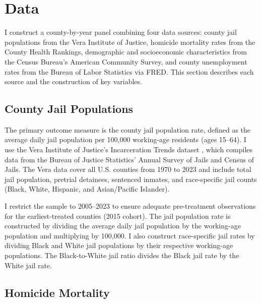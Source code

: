 \documentclass[12pt]{article}
\begin{document}
\section{Data}

I construct a county-by-year panel combining four data sources: county jail populations from the Vera Institute of Justice, homicide mortality rates from the County Health Rankings, demographic and socioeconomic characteristics from the Census Bureau's American Community Survey, and county unemployment rates from the Bureau of Labor Statistics via FRED. This section describes each source and the construction of key variables.

\subsection{County Jail Populations}

The primary outcome measure is the county jail population rate, defined as the average daily jail population per 100,000 working-age residents (ages 15--64). I use the Vera Institute of Justice's Incarceration Trends dataset \citep{vera2024incarceration}, which compiles data from the Bureau of Justice Statistics' Annual Survey of Jails and Census of Jails. The Vera data cover all U.S. counties from 1970 to 2023 and include total jail population, pretrial detainees, sentenced inmates, and race-specific jail counts (Black, White, Hispanic, and Asian/Pacific Islander).

I restrict the sample to 2005--2023 to ensure adequate pre-treatment observations for the earliest-treated counties (2015 cohort). The jail population rate is constructed by dividing the average daily jail population by the working-age population and multiplying by 100,000. I also construct race-specific jail rates by dividing Black and White jail populations by their respective working-age populations. The Black-to-White jail ratio divides the Black jail rate by the White jail rate.

\subsection{Homicide Mortality}
\end{document}
